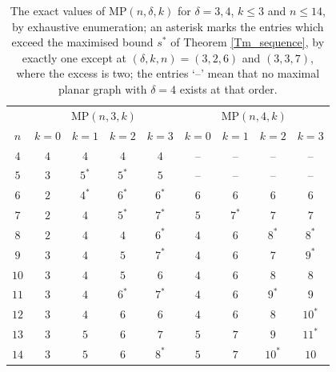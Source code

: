 \documentclass[10pt,a4paper]{article}
\begin{document}
\begin{table}[ht]
\small
\begin{center}
\begin{tabular}{|c|cccc|cccc|}
\hline
& \multicolumn{4}{c|}{$\mathrm{MP}(n,3,k)$} & \multicolumn{4}{c|}{$\mathrm{MP}(n,4,k)$}\\
$n$ & $k=0$ & $k=1$ & $k=2$ & $k=3$ & $k=0$ & $k=1$ & $k=2$ & $k=3$\\ \hline
$4$ & $4$ & $4$ & $4$ & $4$ & -- & -- & -- & --\\
$5$ & $3$ & $5^{\ast }$ & $5^{\ast }$ & $5$ & -- & -- & -- & --\\
$6$ & $2$ & $4^{\ast }$ & $6^{\ast }$ & $6^{\ast }$ & $6$ & $6$ & $6$ & $6$\\
$7$ & $2$ & $4$ & $5^{\ast }$ & $7^{\ast }$ & $5$ & $7^{\ast }$ & $7$ & $7$\\
$8$ & $2$ & $4$ & $4$ & $6^{\ast }$ & $4$ & $6$ & $8^{\ast }$ & $8^{\ast }$\\
$9$ & $3$ & $4$ & $5$ & $7^{\ast }$ & $4$ & $6$ & $7$ & $9^{\ast }$\\
$10$ & $3$ & $4$ & $5$ & $6$ & $4$ & $6$ & $8$ & $8$\\
$11$ & $3$ & $4$ & $6^{\ast }$ & $7^{\ast }$ & $4$ & $6$ & $9^{\ast }$ & $9$\\
$12$ & $3$ & $4$ & $6$ & $6$ & $4$ & $6$ & $8$ & $10^{\ast }$\\
$13$ & $3$ & $5$ & $6$ & $7$ & $5$ & $7$ & $9$ & $11^{\ast }$\\
$14$ & $3$ & $5$ & $6$ & $8^{\ast }$ & $5$ & $7$ & $10^{\ast }$ & $10$\\ \hline
\end{tabular}
\end{center}
\caption{The exact values of $\mathrm{MP}(n,\delta ,k)$ for $\delta =3,4$, $k\leq 3$ and $n\leq 14$,
by exhaustive enumeration; an asterisk marks the entries which exceed the maximised bound $s^{\ast }$
of Theorem \ref{Tm_sequence}, by exactly one except at $(\delta ,k,n)=(3,2,6)$ and $(3,3,7)$, where the excess
is two; the entries `--' mean that no maximal planar graph with $\delta =4$ exists at that order.}%
\label{Tab_MP34small}%
\end{table}
\end{document}
